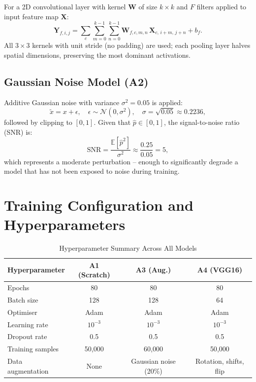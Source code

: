 \documentclass[12pt,a4paper]{article}
\begin{document}
For a 2D convolutional layer with kernel $\mathbf{W}$ of size $k \times k$ and $F$ filters applied to input feature map $\mathbf{X}$:
\begin{equation}
    \mathbf{Y}_{f,i,j} = \sum_{c}\sum_{m=0}^{k-1}\sum_{n=0}^{k-1} \mathbf{W}_{f,c,m,n}\,\mathbf{X}_{c,\,i+m,\,j+n} + b_f.
\end{equation}
All $3\times3$ kernels with unit stride (no padding) are used; each pooling layer halves spatial dimensions, preserving the most dominant activations.

\subsection{Gaussian Noise Model (A2)}

Additive Gaussian noise with variance $\sigma^2 = 0.05$ is applied:
\begin{equation}
    \tilde{x} = x + \epsilon, \quad \epsilon \sim \mathcal{N}(0, \sigma^2), \quad \sigma = \sqrt{0.05} \approx 0.2236,
\end{equation}
followed by clipping to $[0, 1]$. Given that $\hat{p} \in [0,1]$, the signal-to-noise ratio (SNR) is:
\begin{equation}
    \text{SNR} = \frac{\mathbb{E}[\hat{p}^2]}{\sigma^2} \approx \frac{0.25}{0.05} = 5,
\end{equation}
which represents a moderate perturbation -- enough to significantly degrade a model that has not been exposed to noise during training.

\section{Training Configuration and Hyperparameters}

\begin{table}[H]
\centering
\caption{Hyperparameter Summary Across All Models}
\begin{tabular}{lccc}
\toprule
\textbf{Hyperparameter} & \textbf{A1 (Scratch)} & \textbf{A3 (Aug.)} & \textbf{A4 (VGG16)} \\
\midrule
Epochs           & 80        & 80        & 80 \\
Batch size       & 128       & 128       & 64 \\
Optimiser        & Adam      & Adam      & Adam \\
Learning rate    & $10^{-3}$ & $10^{-3}$ & $10^{-3}$ \\
Dropout rate     & 0.5       & 0.5       & 0.5 \\
Training samples & 50{,}000  & 60{,}000  & 50{,}000 \\
Data augmentation & None     & Gaussian noise (20\%) & Rotation, shifts, flip \\
\bottomrule
\end{tabular}
\end{table}
\end{document}
